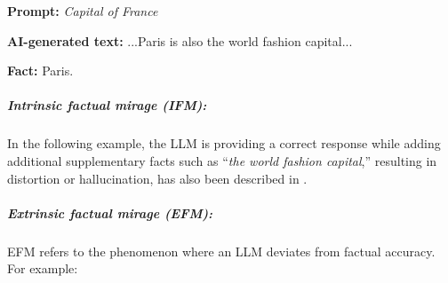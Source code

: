 \vspace{-2mm}
\begin{tcolorbox}[enhanced,attach boxed title to top right={yshift=-2.5mm,yshifttext=-1mm},
  left=1pt,right=1pt,top=1pt,bottom=1pt,colback=blue!5!white,colframe=blue!75!black,colbacktitle=cyan!80!black,
  title=mild,fonttitle=\ttfamily\bfseries\scshape\fontsize{9}{9.6}\selectfont,
  boxed title style={size=fbox,colframe=cyan!50!black} ]
  \begin{spacing}{0.75}
  \textbf{\scriptsize Prompt:} \textit{\scriptsize Capital of France}
  \end{spacing}

  \vspace{-2mm}
  \DrawLine
  
  \begin{spacing}{0.75}
  \textbf{\scriptsize AI-generated text:} {\scriptsize\selectfont
  ...Paris is also the world fashion capital...}
  \end{spacing}

  \vspace{-2mm}
  \DrawLine

  \textbf{\scriptsize Fact:} \scriptsize Paris.


\end{tcolorbox}
\vspace{-4mm}

\subparagraph{Intrinsic factual mirage (IFM):}
In the following example, the LLM is providing a correct response while adding additional supplementary facts such as ``\emph{the world fashion capital},'' resulting in distortion or hallucination, has also been described in \cite{cao2022hallucinated}. 



\subparagraph{Extrinsic factual mirage (EFM):} EFM refers to the phenomenon where an LLM deviates from factual accuracy. For example: 

